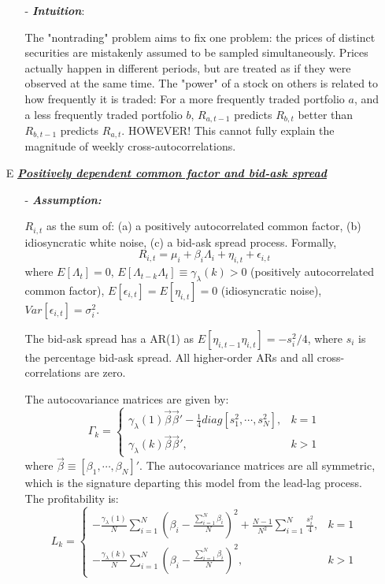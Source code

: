 \begin{enumerate}
\begin{enumerate}
        \item[-] \textbf{\textit{Intuition}}:
        
        The "nontrading" problem aims to fix one problem: the prices of distinct securities are mistakenly assumed to be sampled simultaneously. Prices actually happen
        in different periods, but are treated as if they were observed at the same time. The "power" of a stock on others is related to how frequently it is traded: For
        a more frequently traded portfolio $a$, and a less frequently traded portfolio $b$, $R_{a,t-1}$ predicts $R_{b,t}$ better than $R_{b,t-1}$ predicts $R_{a,t}$.
        HOWEVER! This cannot fully explain the magnitude of weekly cross-autocorrelations.
    
    \end{enumerate} 
    \item[E] \underline{\textbf{\textit{Positively dependent common factor and bid-ask spread}}}
    \begin{enumerate}
        \item[-] \textbf{\textit{Assumption:}}
        
        $R_{i,t}$ as the sum of: (a) a positively autocorrelated common factor, (b) idiosyncratic white noise, (c) a bid-ask spread process. Formally, 
        $$R_{i,t}=\mu_i+\beta_i\Lambda_i+\eta_{i,t}+\epsilon_{i,t}$$
        where $E[\Lambda_t]=0$, $E[\Lambda_{t-k}\Lambda_t]\equiv\gamma_{\lambda}(k)>0$ (positively autocorrelated common factor), $E[\epsilon_{i,t}]=E[\eta_{i,t}]=0$ (idiosyncratic noise),
        $Var[\epsilon_{i,t}]=\sigma^2_i$.

        The bid-ask spread has a AR(1) as $E[\eta_{i,t-1}\eta_{i,t}]=-s_i^2/4$, where $s_i$ is the percentage bid-ask spread. All higher-order ARs and all cross-correlations are zero.

        The autocovariance matrices are given by:
        $$\Gamma_k =
        \begin{cases}
            \gamma_{\lambda}(1)\vec{\beta}\vec{\beta}' -\frac{1}{4}diag[s_1^2,\cdots,s_N^2],&k=1\\
            \gamma_{\lambda}(k)\vec{\beta}\vec{\beta}',&k>1
        \end{cases}
        $$
        where $\vec{\beta}\equiv[\beta_1,\cdots,\beta_N]'$. The autocovariance matrices are all symmetric, which is the signature departing this model from the lead-lag process.
        The profitability is:
        $$L_k=
        \begin{cases}
            -\frac{\gamma_{\lambda}(1)}{N}\sum^N_{i=1}(\beta_i-\frac{\sum^N_{i=1}\beta_i}{N})^2 +\frac{N-1}{N^2}\sum^N_{i=1}\frac{s_i^2}{4}, & k=1\\
            -\frac{\gamma_{\lambda}(k)}{N}\sum^N_{i=1}(\beta_i-\frac{\sum^N_{i=1}\beta_i}{N})^2, &k>1
        \end{cases}
        $$


\end{enumerate}
\end{enumerate}

